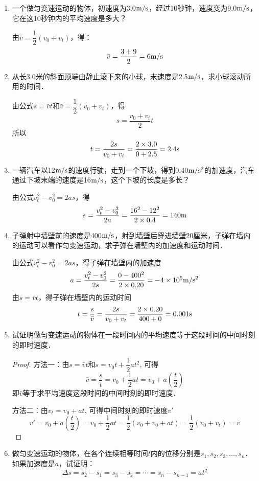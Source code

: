 \begin{enumerate}
\item 一个做匀变速运动的物体，初速度为3.0$\text{m}/\text{s}$，经过10秒钟，速度变为9.0$\text{m}/\text{s}$，它在这10秒钟内的平均速度是多大？   

\begin{solution}
由$\bar v=\dfrac{1}{2}(v_0+v_t)$，得：
\[\bar v=\frac{3+9}{2}=6\text{m}/\text{s}\]
\end{solution}
\item 从长3.0米的斜面顶端由静止滚下来的小球，末速度是2.5$\text{m}/\text{s}$，求小球滚动所用的时间．   

\begin{solution}
   由公式$s=\bar vt$和$\bar v=\dfrac{1}{2}(v_0+v_t)$，得
   \[s=\frac{v_0+v_t}{2}t\]
   所以
   \[t=\frac{2s}{v_0+v_t}=\frac{2\times 3.0}{0+2.5}=2.4{\rm s}\]
\end{solution}
\item 一辆汽车以12$\text{m}/\text{s}$的速度行驶，走到一个下坡，得到0.40$\text{m}/\text{s}^2$的加速度，汽车通过下坡末端的速度是16$\text{m}/\text{s}$，这个下坡的长度是多长？   

\begin{solution}
   由公式$v^2_t-v^2_0=2as$，得
   $$s=\dfrac{v^2_t-v^2_0}{2a}=\frac{16^2-12^2}{2\times 0.4}=140{\rm m}$$
\end{solution}
\item 子弹射中墙壁前的速度是400$\text{m}/\text{s}$，射到墙壁后穿进墙壁20厘米，子弹在墙内的运动可以看作匀变速运动，求子弹在墙壁内的加速度和运动时间．   

\begin{solution}
    由公式$v^2_t-v^2_0=2as$，得子弹在墙壁内的加速度
    $$a=\dfrac{v^2_t-v^2_0}{2s}=\frac{0-400^2}{2\times 0.20}=-4\times 10^5{\rm m/s^2}$$
由$s=\bar v t$，得子弹在墙壁内的运动时间
\[t=\frac{s}{\bar v}=\frac{2s}{v_0+v_t}=\frac{2\times 0.20}{400+0}=0.001{\rm s}\]
\end{solution}
\item 试证明做匀变速运动的物体在一段时间内的平均速度等于这段时间的中间时刻的即时速度．

\begin{proof}
方法一：由$s=\bar v t$和$s=v_0t+\dfrac{1}{2}at^2$, 可得
\[\bar v=\frac{s}{t}=v_0+\frac{1}{2}at =v_0+a\left(\frac{t}{2}\right)\]
即$\bar v$等于求平均速度这段时间的中间时刻的即时速度．

方法二：由$v_t=v_0+at$, 可得中间时刻的即时速度$v'$
\[v'=v_0+a\left(\frac{t}{2}\right)=v_0+\frac{1}{2}at =\frac{1}{2}(v_0+v_0+at)=\frac{1}{2}(v_0+v_t)=\bar v\]
\end{proof}
\item 做匀变速运动的物体，在各个连续相等时间$t$内的位移分别是$s_1, s_2, s_3,\ldots,s_n$．如果加速度是$a$，试证明：
\[\Delta s=s_2-s_1=s_3-s_2=\cdots=s_n-s_{n-1}=at^2 \]


\end{enumerate}
